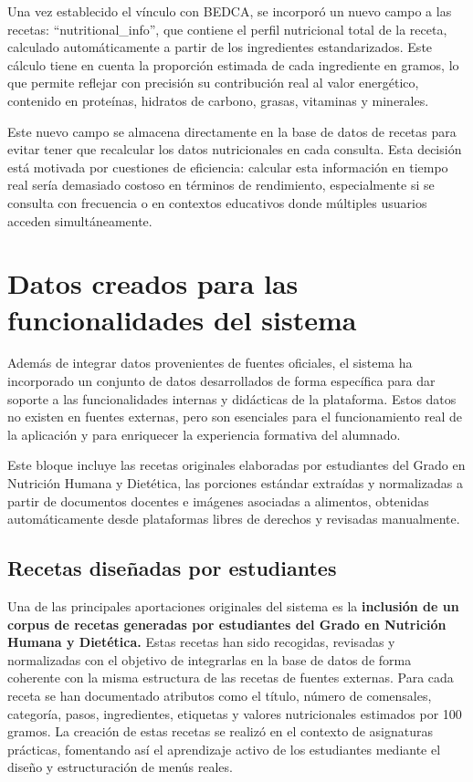 Una vez establecido el vínculo con BEDCA, se incorporó un nuevo campo a las recetas: ``nutritional\_info'', que contiene el perfil nutricional total de la receta, calculado automáticamente a partir de los ingredientes estandarizados. Este cálculo tiene en cuenta la proporción estimada de cada ingrediente en gramos, lo que permite reflejar con precisión su contribución real al valor energético, contenido en proteínas, hidratos de carbono, grasas, vitaminas y minerales.

Este nuevo campo se almacena directamente en la base de datos de recetas para evitar tener que recalcular los datos nutricionales en cada consulta. Esta decisión está motivada por cuestiones de eficiencia: calcular esta información en tiempo real sería demasiado costoso en términos de rendimiento, especialmente si se consulta con frecuencia o en contextos educativos donde múltiples usuarios acceden simultáneamente.

\section{Datos creados para las funcionalidades del sistema}
Además de integrar datos provenientes de fuentes oficiales, el sistema ha incorporado un conjunto de datos desarrollados de forma específica para dar soporte a las funcionalidades internas y didácticas de la plataforma. Estos datos no existen en fuentes externas, pero son esenciales para el funcionamiento real de la aplicación y para enriquecer la experiencia formativa del alumnado.

Este bloque incluye las recetas originales elaboradas por estudiantes del Grado en Nutrición Humana y Dietética,  las porciones estándar extraídas y normalizadas a partir de documentos docentes e imágenes asociadas a alimentos, obtenidas automáticamente desde plataformas libres de derechos y revisadas manualmente.

\subsection{Recetas diseñadas por estudiantes}

Una de las principales aportaciones originales del sistema es la\textbf{ inclusión de un corpus de recetas generadas por estudiantes del Grado en Nutrición Humana y Dietética.} Estas recetas han sido recogidas, revisadas y normalizadas con el objetivo de integrarlas en la base de datos de forma coherente con la misma estructura de las recetas de fuentes externas. Para cada receta se han documentado atributos como el título, número de comensales, categoría, pasos, ingredientes, etiquetas y valores nutricionales estimados por 100 gramos. La creación de estas recetas se realizó en el contexto de asignaturas prácticas, fomentando así el aprendizaje activo de los estudiantes mediante el diseño y estructuración de menús reales. 

